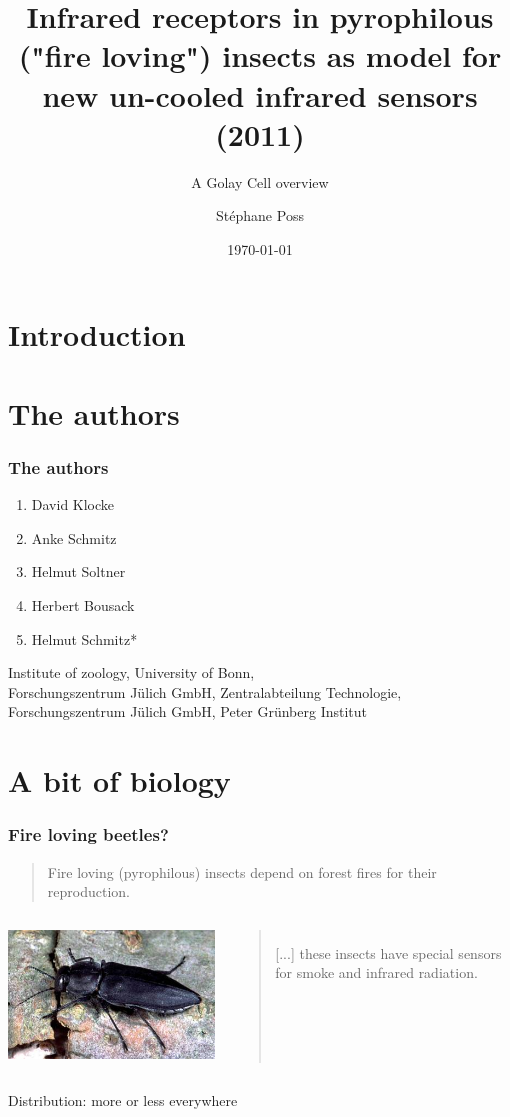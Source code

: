 \documentclass[14pt]{beamer}
\title{Infrared receptors in pyrophilous\\ ("fire loving") insects as model for new un-cooled infrared sensors (2011)}
\subtitle{A Golay Cell overview}
\author{St\'ephane Poss}
\date{\today}
\begin{document}
\begin{frame}[plain]
\titlepage
\end{frame}

\section{Introduction}

\begin{frame}
\tableofcontents
\end{frame}

\section{The authors}
\begin{frame}
\frametitle{The authors}
\begin{enumerate}
\item David Klocke
\item Anke Schmitz
\item Helmut Soltner
\item Herbert Bousack
\item Helmut Schmitz*
\end{enumerate}
Institute of zoology, University of Bonn,\\
Forschungszentrum J\"ulich GmbH, Zentralabteilung Technologie,\\
Forschungszentrum J\"ulich GmbH, Peter Gr\"unberg Institut
\end{frame}

\section{A bit of biology}
\begin{frame}
\frametitle{Fire loving beetles?}
\begin{quote}
Fire loving (pyrophilous) insects depend on forest fires for their reproduction.
\end{quote}
\begin{columns}
\includegraphics[width=\textwidth]{kaefer_03.jpg}
\begin{quote}
[...] these insects have special sensors for smoke and infrared radiation.
\end{quote}
\end{columns}
Distribution: more or less everywhere
\end{frame}
\end{document}
